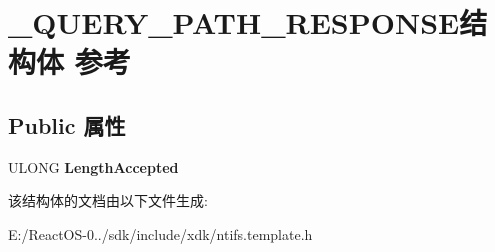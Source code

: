 \hypertarget{struct___q_u_e_r_y___p_a_t_h___r_e_s_p_o_n_s_e}{}\section{\+\_\+\+Q\+U\+E\+R\+Y\+\_\+\+P\+A\+T\+H\+\_\+\+R\+E\+S\+P\+O\+N\+S\+E结构体 参考}
\label{struct___q_u_e_r_y___p_a_t_h___r_e_s_p_o_n_s_e}
\subsection*{Public 属性}
\begin{DoxyCompactItemize}
\item 
\mbox{\label{struct___q_u_e_r_y___p_a_t_h___r_e_s_p_o_n_s_e_ae0fd239bc7cd883b5ba1349aa526e42c}} 
U\+L\+O\+NG {\bfseries Length\+Accepted}
\end{DoxyCompactItemize}


该结构体的文档由以下文件生成\+:\begin{DoxyCompactItemize}
\item 
E\+:/\+React\+O\+S-\/0../sdk/include/xdk/ntifs.\+template.\+h\end{DoxyCompactItemize}
